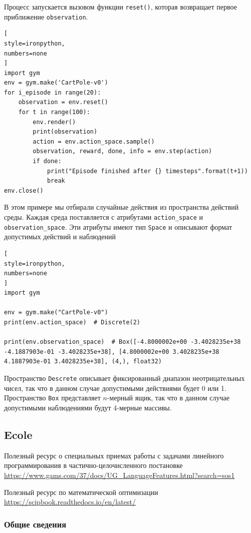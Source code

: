 \documentclass[%
	11pt,
	a4paper,
	utf8,
		]{article}
\begin{document}
Процесс запускается вызовом функции \verb|reset()|, которая возвращает первое приближение \texttt{observation}.  
\begin{lstlisting}[
style=ironpython,
numbers=none
]
import gym
env = gym.make('CartPole-v0')
for i_episode in range(20):
    observation = env.reset()
    for t in range(100):
        env.render()
        print(observation)
        action = env.action_space.sample()
        observation, reward, done, info = env.step(action)
        if done:
            print("Episode finished after {} timesteps".format(t+1))
            break
env.close()
\end{lstlisting}

В этом примере мы отбирали случайные действия из пространства действий среды. Каждая среда поставляется с атрибутами \verb|action_space| и \verb|observation_space|. Эти атрибуты имеют тип \verb|Space| и описывают формат допустимых действий и наблюдений
\begin{lstlisting}[
style=ironpython,
numbers=none
]
import gym

env = gym.make("CartPole-v0")
print(env.action_space)  # Discrete(2)

print(env.observation_space)  # Box([-4.8000002e+00 -3.4028235e+38 -4.1887903e-01 -3.4028235e+38], [4.8000002e+00 3.4028235e+38 4.1887903e-01 3.4028235e+38], (4,), float32)
\end{lstlisting}

Пространство \texttt{Descrete} описывает фиксированный диапазон неотрицательных чисел, так что в данном случае допустимыми действиями будет 0 или 1. Пространство \texttt{Box} представляет $ n $-мерный ящик, так что в данном случае допустимыми наблюдениями будут 4-мерные массивы.

\subsection{Ecole}

Полезный ресурс о специальных приемах работы с задачами линейного программирования в частично-целочисленного постановке \url{https://www.gams.com/37/docs/UG_LanguageFeatures.html?search=sos1}

Полезный ресурс по математической оптимизации \url{https://scipbook.readthedocs.io/en/latest/}

\subsubsection{Общие сведения}
\end{document}
